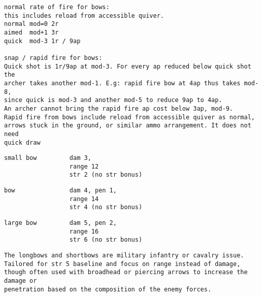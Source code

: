 \goodbreak \small \begin{samepage} \begin{verbatim}
normal rate of fire for bows:
this includes reload from accessible quiver.
normal mod=0 2r
aimed  mod+1 3r
quick  mod-3 1r / 9ap

snap / rapid fire for bows:
Quick shot is 1r/9ap at mod-3. For every ap reduced below quick shot the
archer takes another mod-1. E.g: rapid fire bow at 4ap thus takes mod-8,
since quick is mod-3 and another mod-5 to reduce 9ap to 4ap.
An archer cannot bring the rapid fire ap cost below 3ap, mod-9.
Rapid fire from bows include reload from accessible quiver as normal,
arrows stuck in the ground, or similar ammo arrangement. It does not need
quick draw
\end{verbatim} \blocklistgap \begin{verbatim}
small bow         dam 3,
                  range 12
                  str 2 (no str bonus)
\end{verbatim} \blocklistgap \begin{verbatim}
bow               dam 4, pen 1,
                  range 14
                  str 4 (no str bonus)
\end{verbatim} \blocklistgap \begin{verbatim}
large bow         dam 5, pen 2,
                  range 16
                  str 6 (no str bonus)
\end{verbatim} \blocklistgap \begin{verbatim}
The longbows and shortbows are military infantry or cavalry issue.
Tailored for str 5 baseline and focus on range instead of damage,
though often used with broadhead or piercing arrows to increase the damage or
penetration based on the composition of the enemy forces.


\end{verbatim}
\end{samepage}
